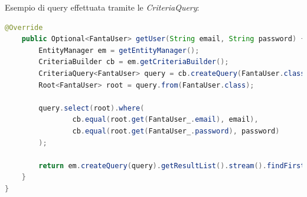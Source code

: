 Esempio di query effettuata tramite le \textit{CriteriaQuery}:
\begin{lstlisting}[language=Java]
@Override
	public Optional<FantaUser> getUser(String email, String password) {
    	EntityManager em = getEntityManager();
        CriteriaBuilder cb = em.getCriteriaBuilder();
        CriteriaQuery<FantaUser> query = cb.createQuery(FantaUser.class);
        Root<FantaUser> root = query.from(FantaUser.class);

        query.select(root).where(
                cb.equal(root.get(FantaUser_.email), email),
                cb.equal(root.get(FantaUser_.password), password)
        );

        return em.createQuery(query).getResultList().stream().findFirst();
	}
}
\end{lstlisting}